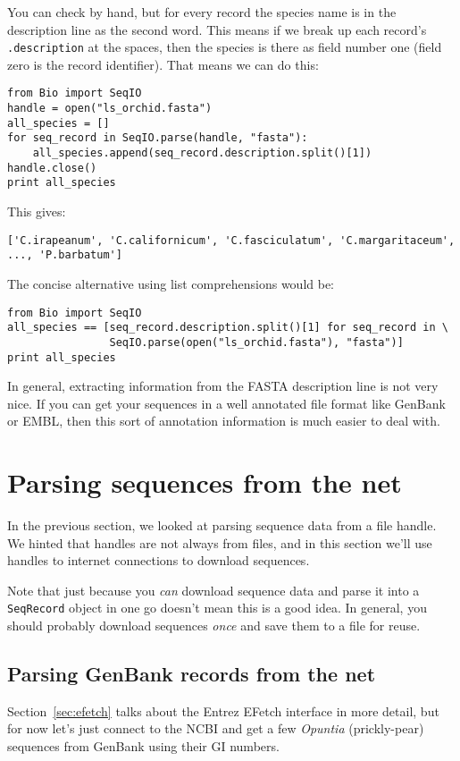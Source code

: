 \documentclass{report}
\begin{document}
You can check by hand, but for every record the species name is in the description line as the second word.  This means if we break up each record's \verb|.description| at the spaces, then the species is there as field number one (field zero is the record identifier).  That means we can do this:

\begin{verbatim}
from Bio import SeqIO
handle = open("ls_orchid.fasta")
all_species = []
for seq_record in SeqIO.parse(handle, "fasta"):
    all_species.append(seq_record.description.split()[1])
handle.close()
print all_species
\end{verbatim}

\noindent This gives:

\begin{verbatim}
['C.irapeanum', 'C.californicum', 'C.fasciculatum', 'C.margaritaceum', ..., 'P.barbatum']
\end{verbatim}

The concise alternative using list comprehensions would be:

\begin{verbatim}
from Bio import SeqIO
all_species == [seq_record.description.split()[1] for seq_record in \
                SeqIO.parse(open("ls_orchid.fasta"), "fasta")]
print all_species
\end{verbatim}

In general, extracting information from the FASTA description line is not very nice.
If you can get your sequences in a well annotated file format like GenBank or EMBL,
then this sort of annotation information is much easier to deal with.

\section{Parsing sequences from the net}
\label{sec:SeqIO_Online}
In the previous section, we looked at parsing sequence data from a file handle.
We hinted that handles are not always from files, and in this section we'll use
handles to internet connections to download sequences.

Note that just because you \emph{can} download sequence data and parse it into
a \verb|SeqRecord| object in one go doesn't mean this is a good idea.
In general, you should probably download sequences \emph{once} and save them to
a file for reuse.

\subsection{Parsing GenBank records from the net}
\label{sec:SeqIO_GenBank_Online}
Section~\ref{sec:efetch} talks about the Entrez EFetch interface in more detail,
but for now let's just connect to the NCBI and get a few \textit{Opuntia} (prickly-pear)
sequences from GenBank using their GI numbers.
\end{document}
